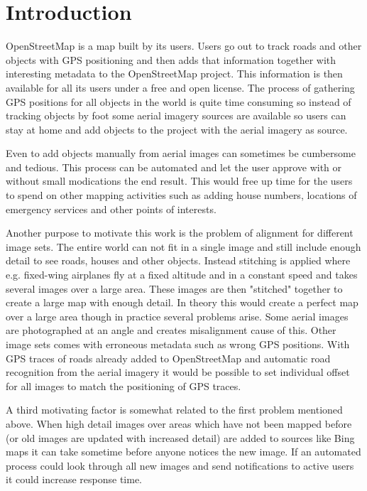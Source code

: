 \section{Introduction}
OpenStreetMap is a map built by its users. Users go out to track roads and
other objects with GPS positioning and then adds that information together with
interesting metadata to the OpenStreetMap project. This information is then
available for all its users under a free and open license. The process of
gathering GPS positions for all objects in the world is quite time consuming
so instead of tracking objects by foot some aerial imagery sources are
available so users can stay at home and add objects to the project with the
aerial imagery as source.

Even to add objects manually from aerial images can sometimes be cumbersome and
tedious. This process can be automated and let the user approve with or
without small modications the end result. This would free up time for the
users to spend on other mapping activities such as adding house numbers,
locations of emergency services and other points of interests.

Another purpose to motivate this work is the problem of alignment for
different image sets. The entire world can not fit in a single image
and still include enough detail to see roads, houses and other objects.
Instead stitching is applied where e.g. fixed-wing airplanes fly at a fixed
altitude and in a constant speed and takes several images over a large area.
These images are then "stitched" together to create a large map with enough detail.
In theory this would create a perfect map over a large area though in practice
several problems arise. Some aerial images are photographed at an angle and
creates misalignment cause of this. Other image sets comes with erroneous metadata
such as wrong GPS positions. With GPS traces of roads already added to OpenStreetMap
and automatic road recognition from the aerial imagery it would be possible to
set individual offset for all images to match the positioning of GPS traces.

A third motivating factor is somewhat related to the first problem mentioned above.
When high detail images over areas which have not been mapped before (or old
images are updated with increased detail) are added to sources like Bing maps
it can take sometime before anyone notices the new image. If an automated
process could look through all new images and send notifications to active
users it could increase response time.

